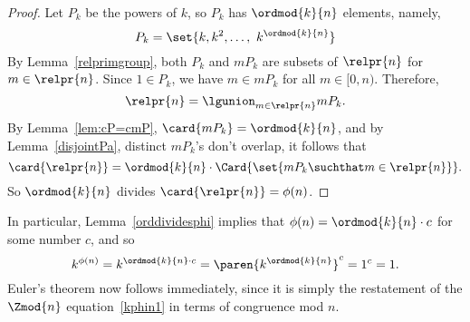 \begin{proof}
Let $P_k$ be the powers of $k$, so $P_k$ has $\ordmod{k}{n}$ elements,
namely,
\[
P_k = \set{k,k^2, \dots,\ k^{\ordmod{k}{n}}}
\]
By Lemma~\ref{relprimgroup}, both $P_k$ and $mP_k$ are subsets of
$\relpr{n}$ for $m \in \relpr{n}$.  Since $1 \in P_k$, we have $m \in
mP_k$ for all $m \in [0,n)$.  Therefore,
\[
\relpr{n} = \lgunion_{m \in \relpr{n}} mP_k.
\]
By Lemma~\ref{lem:cP=cmP}, $\card{mP_k} = \ordmod{k}{n}$, and by
Lemma~\ref{disjointPa}, distinct $mP_k$'s don't overlap, it follows
that
\[
\card{\relpr{n}} = \ordmod{k}{n}\cdot \Card{\set{mP_k \suchthat m \in \relpr{n}}}.
\]
So $\ordmod{k}{n}$ divides $\card{\relpr{n}} = \phi(n)$.
\end{proof}

In particular, Lemma~\ref{orddividesphi} implies that
$\phi(n) = \ordmod{k}{n} \cdot c$ for some number $c$, and so
\begin{equation}\label{kphin1}
k^{\phi(n)} = k^{\ordmod{k}{n} \cdot c} = \paren{k^{\ordmod{k}{n}}}^c = 1^c = 1.
\end{equation}
Euler's theorem now follows immediately, since it is simply the
restatement of the $\Zmod{n}$ equation~\eqref{kphin1} in terms of
congruence mod $n$.

